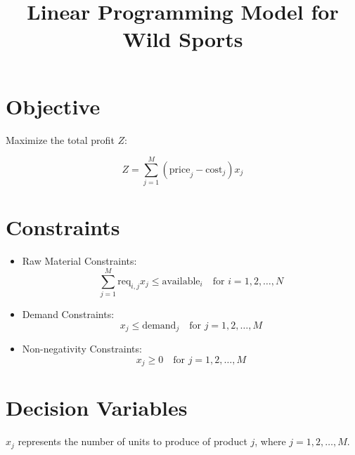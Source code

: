 \documentclass{article}
\begin{document}
\title{Linear Programming Model for Wild Sports}
\author{}
\date{}
\maketitle

\section*{Objective}

Maximize the total profit \( Z \):

\[
Z = \sum_{j=1}^{M} (\text{price}_j - \text{cost}_j) x_j
\]

\section*{Constraints}

\begin{itemize}
    \item Raw Material Constraints:
    \[
    \sum_{j=1}^{M} \text{req}_{i,j} x_j \leq \text{available}_i \quad \text{for } i = 1, 2, \ldots, N
    \]

    \item Demand Constraints:
    \[
    x_j \leq \text{demand}_j \quad \text{for } j = 1, 2, \ldots, M
    \]

    \item Non-negativity Constraints:
    \[
    x_j \geq 0 \quad \text{for } j = 1, 2, \ldots, M
    \]
\end{itemize}

\section*{Decision Variables}

\( x_j \) represents the number of units to produce of product \( j \), where \( j = 1, 2, \ldots, M \).
\end{document}
